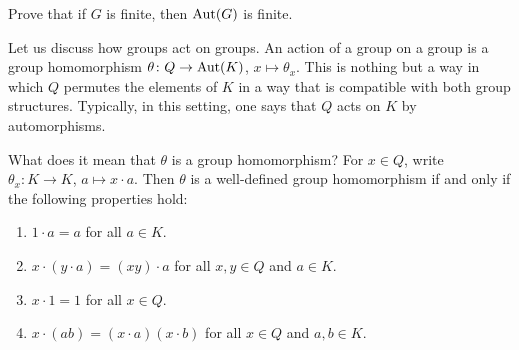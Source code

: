 \begin{exercise}
\label{xca:aut_finite}
    Prove that if $G$ is finite, then $\operatorname{Aut}(G)$ is finite.
\end{exercise}







Let us discuss how groups act on groups. An action of a group on a group is 
a group homomorphism 
$\theta\colon Q\to\operatorname{Aut}(K)$, $x\mapsto\theta_x$. 
This is nothing but a way in which $Q$ permutes the elements of $K$ 
in a way that is compatible with both group structures. Typically, in this setting, 
one says that $Q$ acts on $K$ by automorphisms. 

What does it mean that $\theta$ is a group homomorphism? 
For $x\in Q$, write $\theta_x\colon K\to K$, $a\mapsto x\cdot a$. 
Then $\theta$ is a well-defined group homomorphism if and only if 
the following properties hold: 
\begin{enumerate}
    \item $1\cdot a=a$ for all $a\in K$. 
    \item $x\cdot (y\cdot a)=(xy)\cdot a$ for all $x,y\in Q$ and $a\in K$.
    \item $x\cdot 1=1$ for all $x\in Q$. 
    \item $x\cdot (ab)=(x\cdot a)(x\cdot b)$ for all $x\in Q$ and $a,b\in K$. 
\end{enumerate}

